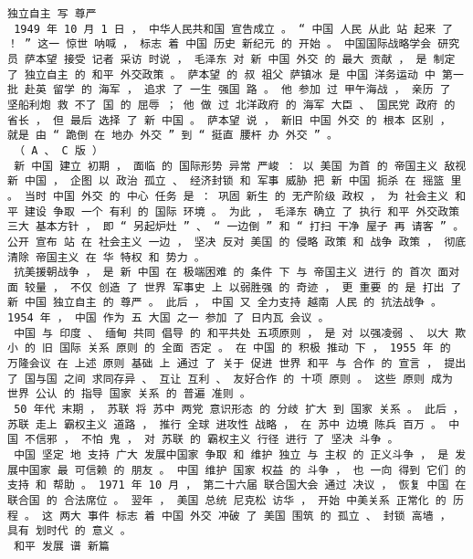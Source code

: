 \documentclass{article}
\begin{document}
\begin{Verbatim}[commandchars=\\\{\}]
 独立自主 写 尊严 
 1949 年 10 月 1 日 ， 中华人民共和国 宣告成立 。 “ 中国 人民 从此 站 起来 了 ！ ” 这一 惊世 呐喊 ， 标志 着 中国 历史 新纪元 的 开始 。 中国国际战略学会 研究员 萨本望 接受 记者 采访 时说 ， 毛泽东 对 新 中国 外交 的 最大 贡献 ， 是 制定 了 独立自主 的 和平 外交政策 。 萨本望 的 叔 祖父 萨镇冰 是 中国 洋务运动 中 第一批 赴英 留学 的 海军 ， 追求 了 一生 强国 路 。 他 参加 过 甲午海战 ， 亲历 了 坚船利炮 救 不了 国 的 屈辱 ； 他 做 过 北洋政府 的 海军 大臣 、 国民党 政府 的 省长 ， 但 最后 选择 了 新 中国 。 萨本望 说 ， 新旧 中国 外交 的 根本 区别 ， 就是 由 “ 跪倒 在 地办 外交 ” 到 “ 挺直 腰杆 办 外交 ” 。 
 （ A 、 C 版 ） 
 新 中国 建立 初期 ， 面临 的 国际形势 异常 严峻 ： 以 美国 为首 的 帝国主义 敌视 新 中国 ， 企图 以 政治 孤立 、 经济封锁 和 军事 威胁 把 新 中国 扼杀 在 摇篮 里 。 当时 中国 外交 的 中心 任务 是 ： 巩固 新生 的 无产阶级 政权 ， 为 社会主义 和平 建设 争取 一个 有利 的 国际 环境 。 为此 ， 毛泽东 确立 了 执行 和平 外交政策 三大 基本方针 ， 即 “ 另起炉灶 ” 、 “ 一边倒 ” 和 “ 打扫 干净 屋子 再 请客 ” 。 公开 宣布 站 在 社会主义 一边 ， 坚决 反对 美国 的 侵略 政策 和 战争 政策 ， 彻底清除 帝国主义 在 华 特权 和 势力 。 
 抗美援朝战争 ， 是 新 中国 在 极端困难 的 条件 下 与 帝国主义 进行 的 首次 面对面 较量 ， 不仅 创造 了 世界 军事史 上 以弱胜强 的 奇迹 ， 更 重要 的 是 打出 了 新 中国 独立自主 的 尊严 。 此后 ， 中国 又 全力支持 越南 人民 的 抗法战争 。 1954 年 ， 中国 作为 五 大国 之一 参加 了 日内瓦 会议 。 
 中国 与 印度 、 缅甸 共同 倡导 的 和平共处 五项原则 ， 是 对 以强凌弱 、 以大 欺小 的 旧 国际 关系 原则 的 全面 否定 。 在 中国 的 积极 推动 下 ， 1955 年 的 万隆会议 在 上述 原则 基础 上 通过 了 关于 促进 世界 和平 与 合作 的 宣言 ， 提出 了 国与国 之间 求同存异 、 互让 互利 、 友好合作 的 十项 原则 。 这些 原则 成为 世界 公认 的 指导 国家 关系 的 普遍 准则 。 
 50 年代 末期 ， 苏联 将 苏中 两党 意识形态 的 分歧 扩大 到 国家 关系 。 此后 ， 苏联 走上 霸权主义 道路 ， 推行 全球 进攻性 战略 ， 在 苏中 边境 陈兵 百万 。 中国 不信邪 ， 不怕 鬼 ， 对 苏联 的 霸权主义 行径 进行 了 坚决 斗争 。 
 中国 坚定 地 支持 广大 发展中国家 争取 和 维护 独立 与 主权 的 正义斗争 ， 是 发展中国家 最 可信赖 的 朋友 。 中国 维护 国家 权益 的 斗争 ， 也 一向 得到 它们 的 支持 和 帮助 。 1971 年 10 月 ， 第二十六届 联合国大会 通过 决议 ， 恢复 中国 在 联合国 的 合法席位 。 翌年 ， 美国 总统 尼克松 访华 ， 开始 中美关系 正常化 的 历程 。 这 两大 事件 标志 着 中国 外交 冲破 了 美国 围筑 的 孤立 、 封锁 高墙 ， 具有 划时代 的 意义 。 
 和平 发展 谱 新篇 

\end{Verbatim}
\end{document}
